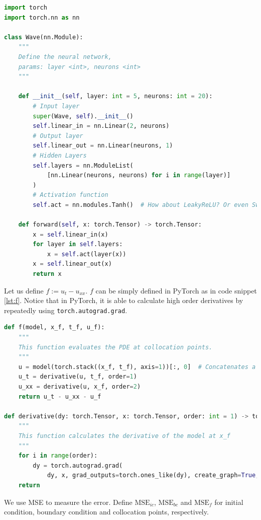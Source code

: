 \documentclass[10pt, a4paper]{article}
\begin{document}
\lstset{style=mystyle}
\begin{lstlisting}[language=Python, caption=Definition of the neural network using PyTorch, label={lst:nn}]
import torch
import torch.nn as nn

class Wave(nn.Module):
    """
    Define the neural network,
    params: layer <int>, neurons <int>
    """

    def __init__(self, layer: int = 5, neurons: int = 20):
        # Input layer
        super(Wave, self).__init__()
        self.linear_in = nn.Linear(2, neurons)
        # Output layer
        self.linear_out = nn.Linear(neurons, 1)
        # Hidden Layers
        self.layers = nn.ModuleList(
            [nn.Linear(neurons, neurons) for i in range(layer)]
        )
        # Activation function
        self.act = nn.modules.Tanh()  # How about LeakyReLU? Or even Swish?

    def forward(self, x: torch.Tensor) -> torch.Tensor:
        x = self.linear_in(x)
        for layer in self.layers:
            x = self.act(layer(x))
        x = self.linear_out(x)
        return x
\end{lstlisting}


Let us define $f:=u_t-u_{xx}$.  $f$ can be simply defined in PyTorch as in code snippet \ref{lst:f}. Notice that in PyTorch, it is able to calculate high order derivatives by repeatedly using \lstinline{torch.autograd.grad}.


\begin{lstlisting}[language=Python, caption=Definition of the output using PyTorch, label={lst:f}]
def f(model, x_f, t_f, u_f):
    """
    This function evaluates the PDE at collocation points.
    """
    u = model(torch.stack((x_f, t_f), axis=1))[:, 0]  # Concatenates a seq of tensors along a new dimension
    u_t = derivative(u, t_f, order=1)
    u_xx = derivative(u, x_f, order=2)
    return u_t - u_xx - u_f

def derivative(dy: torch.Tensor, x: torch.Tensor, order: int = 1) -> torch.Tensor:
    """
    This function calculates the derivative of the model at x_f
    """
    for i in range(order):
        dy = torch.autograd.grad(
            dy, x, grad_outputs=torch.ones_like(dy), create_graph=True, retain_graph=True)[0]
    return 
\end{lstlisting}

We use MSE to measure the error. Define $\text{MSE}_{ic}$, $\text{MSE}_{bc}$ and $\text{MSE}_f$ for initial condition, boundary condition and collocation points, respectively.
\end{document}
